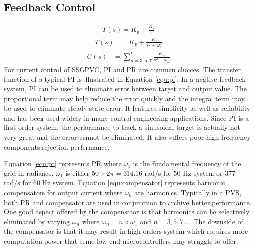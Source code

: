 \subsection{Feedback Control}
\begin{align}\label{equ:pi}
    T(s) = K_p + \frac{K_i}{s}
\end{align}
\begin{align}\label{equ:pr}
    T(s) &= K_p + \frac{K_i}{s^2 + \omega_1^2}
\end{align}
\begin{align}\label{equ:compensator}
    C(s) &= \sum\limits^{k}_{n=3, 5, 7}\frac{K_n}{s^2+\omega_n}
\end{align}
For current control of \gls{SSGPVC}, \gls{PI} and \gls{PR} are common choices. The transfer function of a typical \gls{PI} is illustrated in Equation \eqref{equ:pi}. In a negtive feedback system, \gls{PI} can be used to eliminate error between target and output value. The proportional term may help reduce the error quickly and the integral term may be used to eliminate steady state error. It features simplicity as well as reliability and has been used widely in many control engineering applications. Since \gls{PI} is a first order system, the performance to track a sinusoidal target is actually not very great and the error cannot be eliminated. It also suffers poor high frequency components rejection performance.

Equation \eqref{equ:pr} represents \gls{PR} where $\omega_1$ is the fundamental frequency of the grid in radiance. $\omega_1$ is either $50\times 2\pi=314.16$ rad/s for 50 Hz system or $377$ rad/s for 60 Hz system. Equation \eqref{equ:compensator} represents harmonic compensators for output current where $\omega_n$ are harmonics. Typically in a \gls{PVS}, both \gls{PR} and compensator are used in conjunction to archive better performance. One good aspect offered by the compensator is that harmonics can be selectively eliminated by varying $\omega_n$ where $\omega_n = n \times \omega_1$ and $n=3,5,7\dots$. The downside of the compensator is that it may result in high orders system which requires more computation power that some low end microcontrollers may struggle to offer. 

